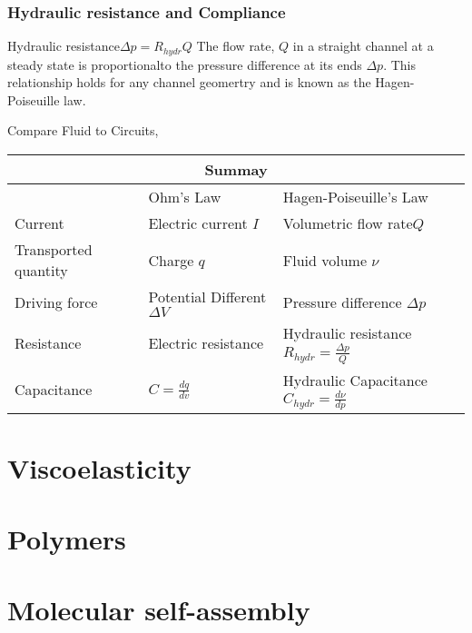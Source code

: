 \documentclass[12pt,a4paper]{article}
\begin{document}
        \subsubsection{Hydraulic resistance and Compliance}
            \begin{definition}
                {Hydraulic resistance}{$\Delta p = R_{hydr}Q$}
                {
                    The flow rate, $Q$ in a straight channel at a steady state is proportionalto the pressure difference at its ends $\Delta p$. This relationship holds for any channel geomertry and is known as the Hagen-Poiseuille law.
                }
            \end{definition}
            Compare Fluid to Circuits,\\
            \begin{tabular}{ p{5cm}p{5cm}p{7cm}  }
                \hline
                \multicolumn{3}{c}{Summay} \\
                \hline
                                & Ohm's Law&Hagen-Poiseuille's Law\\
                Current & Electric current $I$  & Volumetric flow rate$Q$\\
                Transported quantity    & Charge $q$    & Fluid volume $\nu$\\
                Driving force & Potential Different $\Delta V$ & Pressure  difference $\Delta p$\\
                Resistance& Electric resistance     &Hydraulic resistance $R_{hydr}=\frac{\Delta p}{Q}$\\
                Capacitance & $C=\frac{dq}{dv}$ & Hydraulic Capacitance $C_{hydr}=\frac{d\nu}{dp}$\\
                \hline
               \end{tabular}

            
            
\section{Viscoelasticity}
\section{Polymers}
\section{Molecular self-assembly}
\end{document}
